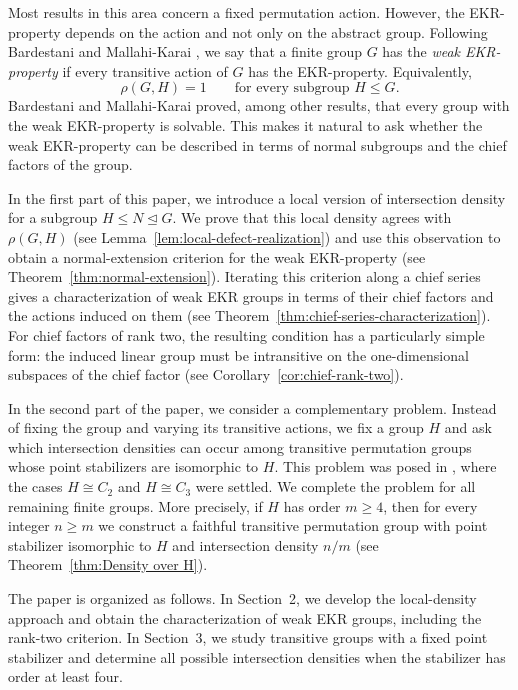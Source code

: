 \documentclass[11pt]{article}
\begin{document}
Most results in this area concern a fixed permutation action. However,
the EKR-property depends on the action and not only on the abstract
group. Following Bardestani and Mallahi-Karai
\cite{BardestaniMallahiKarai2015}, we say that a finite group $G$ has
the \emph{weak EKR-property} if every transitive action of $G$ has the
EKR-property. Equivalently,
\[
\rho(G,H)=1
\qquad\text{for every subgroup }H\leq G.
\]
Bardestani and Mallahi-Karai proved, among other results, that every
group with the weak EKR-property is solvable. This makes it natural to
ask whether the weak EKR-property can be described in terms of normal
subgroups and the chief factors of the group.

In the first part of this paper, we introduce a local version of
intersection density for a subgroup $H\leq N\trianglelefteq G$. We
prove that this local density agrees with $\rho(G,H)$ (see Lemma~\ref{lem:local-defect-realization}) and use this
observation to obtain a normal-extension criterion for the weak
EKR-property (see Theorem~\ref{thm:normal-extension}). Iterating this criterion along a chief series gives a
characterization of weak EKR groups in terms of their chief factors
and the actions induced on them (see Theorem~\ref{thm:chief-series-characterization}). For chief factors of rank two, the
resulting condition has a particularly simple form: the induced
linear group must be intransitive on the one-dimensional subspaces of
the chief factor (see Corollary~\ref{cor:chief-rank-two}). 

In the second part of the paper, we consider a complementary problem.
Instead of fixing the group and varying its transitive actions, we
fix a group $H$ and ask which intersection densities can occur among
transitive permutation groups whose point stabilizers are isomorphic
to $H$. This problem was posed in \cite{HujdurovicKovacsKutnarMarusic2025}, where the cases
$H\cong C_2$ and $H\cong C_3$ were settled. We complete the problem
for all remaining finite groups. More precisely, if $H$ has order
$m\geq 4$, then for every integer $n\geq m$ we construct a faithful
transitive permutation group with point stabilizer isomorphic to $H$
and intersection density $n/m$ (see Theorem~\ref{thm:Density over H}). 

The paper is organized as follows. In Section~2, we develop the
local-density approach and obtain the characterization of weak EKR
groups, including the rank-two criterion. In Section~3, we study transitive groups with a
fixed point stabilizer and determine all possible intersection
densities when the stabilizer has order at least four.
\end{document}
